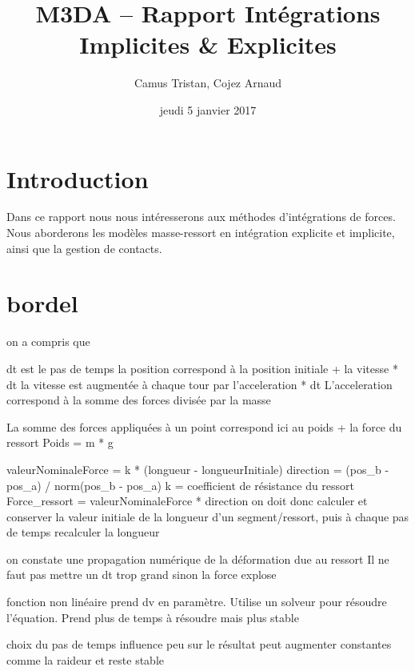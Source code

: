 \documentclass[a4paper]{article}
\begin{document}
\title{M3DA -- Rapport Intégrations Implicites \& Explicites}
\author{Camus Tristan, Cojez Arnaud}
\date{jeudi 5 janvier 2017}

\maketitle


\section{Introduction}

Dans ce rapport nous nous intéresserons aux méthodes d'intégrations de forces. Nous aborderons les modèles masse-ressort en intégration explicite et implicite, ainsi que la gestion de contacts.

\clearpage
\section{bordel}

on a compris que 

dt est le pas de temps
la position correspond à la position initiale + la vitesse * dt
la vitesse est augmentée à chaque tour par l'acceleration * dt
L'acceleration correspond à la somme des forces divisée par la masse

La somme des forces appliquées à un point correspond ici au poids + la force du ressort
Poids = m * g

valeurNominaleForce = k * (longueur - longueurInitiale)
direction = (pos_b - pos_a) / norm(pos_b - pos_a)
k = coefficient de résistance du ressort
Force_ressort = valeurNominaleForce * direction
on doit donc calculer et conserver la valeur initiale de la longueur d'un segment/ressort, puis à chaque pas de temps recalculer la longueur

on constate une propagation numérique de la déformation due au ressort
Il ne faut pas mettre un dt trop grand sinon la force explose

fonction non linéaire prend dv en paramètre. Utilise un solveur pour résoudre l'équation.
Prend plus de temps à résoudre mais plus stable

choix du pas de temps influence peu sur le résultat
peut augmenter constantes comme la raideur et reste stable
\end{document}
